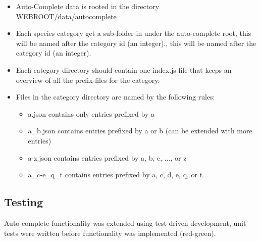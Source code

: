 	\begin{itemize}
		\item Auto-Complete data is rooted in the directory WEBROOT/data/autocomplete
		\item Each species category get a sub-folder in under the auto-complete
		root, this will be named after the category id (an integer)., this will
		be named after the category id (an integer).
		\item Each category directory should contain one index.js file that
		keeps an overview of all the prefix-files for the category.
		\item Files in the category directory are named by the following rules:
			\begin{itemize}
				\item a.json contains only entries prefixed by a
				\item a\_b.json contains entries prefixed by a or b (can be
				extended with more entries)
				\item a-z.json contains entries prefixed by a, b, c, ..., or z
				\item a\_c-e\_q\_t contains entries prefixed by a, c, d, e, q, or t
			\end{itemize}
	\end{itemize}

\subsection{Testing}

Auto-complete functionality was extended using test driven development, unit
tests were written before functionality was implemented (red-green).
